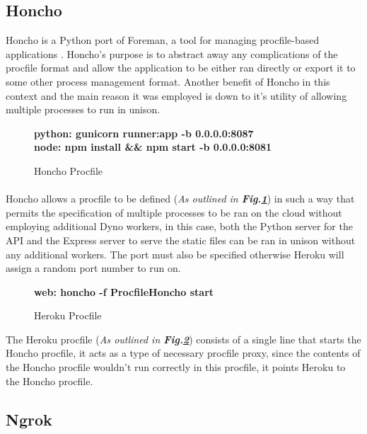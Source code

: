 \subsection{Honcho}
Honcho is a Python port of Foreman, a tool for managing procfile-based applications \cite{HONCHO}. Honcho's purpose is to abstract away any complications of the procfile format and allow the application to be either ran directly or export it to some other process management format. Another benefit of Honcho in this context and the main reason it was employed is down to it's utility of allowing multiple processes to run in unison.

\begin{figure}[H]
    \centering
    \textbf{python: gunicorn runner:app -b 0.0.0.0:8087\\ node: npm install \&\& npm start -b 0.0.0.0:8081}
    \caption{Honcho Procfile}
    \label{image:honchoProcfile}
\end{figure}

\paragraph{}
Honcho allows a procfile to be defined (\textit{As outlined in \textbf{Fig.\ref{image:honchoProcfile}}}) in such a way that permits the specification of multiple processes to be ran on the cloud without employing additional Dyno workers, in this case, both the Python server for the API and the Express server to serve the static files can be ran in unison without any additional workers. The port must also be specified otherwise Heroku will assign a random port number to run on.

\begin{figure}[H]
    \centering
    \textbf{web: honcho -f ProcfileHoncho start}
    \caption{Heroku Procfile}
    \label{image:herokuProcfile}
\end{figure}

The Heroku procfile (\textit{As outlined in \textbf{Fig.\ref{image:herokuProcfile}}}) consists of a single line that starts the Honcho procfile, it acts as a type of necessary procfile proxy, since the contents of the Honcho procfile wouldn't run correctly in this procfile, it points Heroku to the Honcho procfile.

\begin{center}

\end{center}





\subsection{Ngrok}
